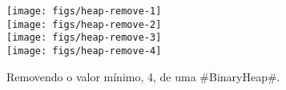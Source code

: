 
\begin{figure}
  \begin{center}
    \texttt{[image: figs/heap-remove-1]} \\
    \texttt{[image: figs/heap-remove-2]} \\
    \texttt{[image: figs/heap-remove-3]} \\
    \texttt{[image: figs/heap-remove-4]} \\
  \end{center}
  \caption[Remoção de uma BinaryHeap]{Removendo o valor mínimo, 4, de uma #BinaryHeap#.}
\end{figure}

